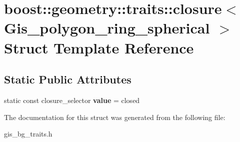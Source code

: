 \hypertarget{structboost_1_1geometry_1_1traits_1_1closure_3_01Gis__polygon__ring__spherical_01_4}{}\section{boost\+:\+:geometry\+:\+:traits\+:\+:closure$<$ Gis\+\_\+polygon\+\_\+ring\+\_\+spherical $>$ Struct Template Reference}
\label{structboost_1_1geometry_1_1traits_1_1closure_3_01Gis__polygon__ring__spherical_01_4}
\subsection*{Static Public Attributes}
\begin{DoxyCompactItemize}
\item 
\mbox{\label{structboost_1_1geometry_1_1traits_1_1closure_3_01Gis__polygon__ring__spherical_01_4_ada279c3e170b0b7cd8784b35d1c8ef35}} 
static const closure\+\_\+selector {\bfseries value} = closed
\end{DoxyCompactItemize}


The documentation for this struct was generated from the following file\+:\begin{DoxyCompactItemize}
\item 
gis\+\_\+bg\+\_\+traits.\+h\end{DoxyCompactItemize}
